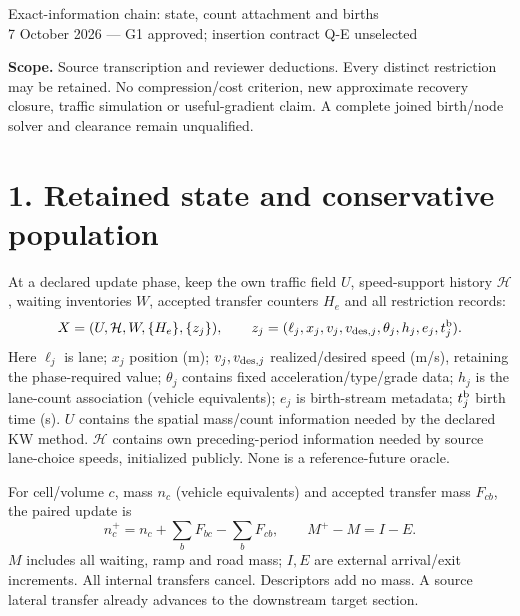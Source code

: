 \documentclass[11pt,a4paper]{article}
\begin{document}
{\Large Exact-information chain: state, count attachment and births}\\[4pt]
7 October 2026 --- G1 approved; insertion contract Q-E unselected

\textbf{Scope.} Source transcription and reviewer deductions. Every distinct
restriction may be retained. No compression/cost criterion, new approximate
recovery closure, traffic simulation or useful-gradient claim. A complete
joined birth/node solver and clearance remain unqualified.

\section*{1. Retained state and conservative population}
At a declared update phase, keep the own traffic field $U$, speed-support
history $\mathcal H$, waiting inventories $W$, accepted transfer counters $H_e$
and all restriction records:
\begin{equation}
X=(U,\mathcal H,W,\{H_e\},\{z_j\}),\qquad
z_j=(\ell_j,x_j,v_j,v_{{\rm des},j},\theta_j,h_j,e_j,t_j^{\rm b}).
\end{equation}
Here $\ell_j$ is lane; $x_j$ position (m); $v_j,v_{{\rm des},j}$ realized/desired
speed (m/s), retaining the phase-required value; $\theta_j$ contains fixed
acceleration/type/grade data; $h_j$ is the lane-count association (vehicle
equivalents); $e_j$ is birth-stream metadata; $t_j^{\rm b}$ birth time (s).
$U$ contains the spatial mass/count information needed by the declared KW
method. $\mathcal H$ contains own preceding-period information needed by source
lane-choice speeds, initialized publicly. None is a reference-future oracle.

For cell/volume $c$, mass $n_c$ (vehicle equivalents) and accepted transfer
mass $F_{cb}$, the paired update is
\begin{equation}
n_c^+=n_c+\sum_bF_{bc}-\sum_bF_{cb},\qquad
M^+-M=I-E.
\end{equation}
$M$ includes all waiting, ramp and road mass; $I,E$ are external arrival/exit
increments. All internal transfers cancel. Descriptors add no mass. A source
lateral transfer already advances to the downstream target section.
\end{document}
